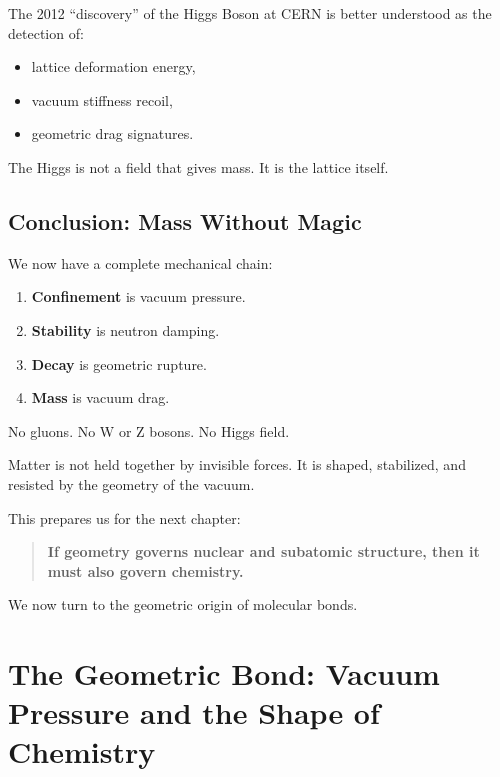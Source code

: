 \documentclass[11pt, letterpaper, openany]{book}
\begin{document}
The 2012 “discovery” of the Higgs Boson at CERN is better understood as the detection of:

\begin{itemize}
    \item lattice deformation energy,
    \item vacuum stiffness recoil,
    \item geometric drag signatures.
\end{itemize}

The Higgs is not a field that gives mass.  
It is the lattice itself.

\section{Conclusion: Mass Without Magic}

We now have a complete mechanical chain:

\begin{enumerate}
    \item \textbf{Confinement} is vacuum pressure.
    \item \textbf{Stability} is neutron damping.
    \item \textbf{Decay} is geometric rupture.
    \item \textbf{Mass} is vacuum drag.
\end{enumerate}

No gluons.  
No W or Z bosons.  
No Higgs field.

Matter is not held together by invisible forces.  
It is shaped, stabilized, and resisted by the geometry of the vacuum.

This prepares us for the next chapter:

\begin{quote}
\textbf{If geometry governs nuclear and subatomic structure, then it must also govern chemistry.}
\end{quote}

We now turn to the geometric origin of molecular bonds.


\chapter{The Geometric Bond: Vacuum Pressure and the Shape of Chemistry}
\label{ch:geometric_bond}
\end{document}

